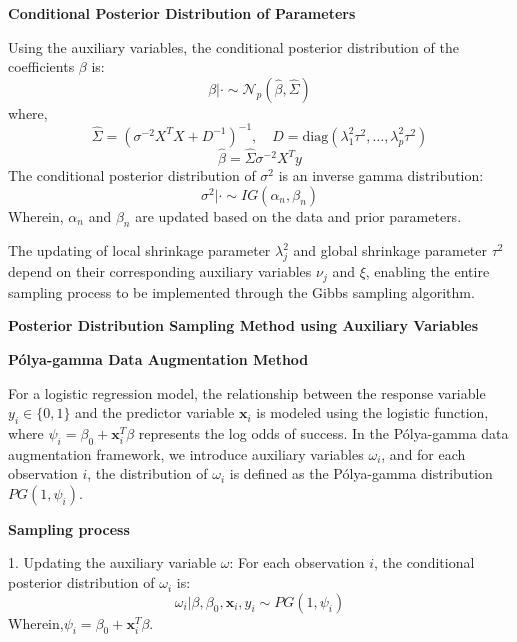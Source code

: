 \documentclass{mcmthesis}
\begin{document}
\begin{appendices}
\noindent\textbf{Conditional Posterior Distribution of Parameters}

Using the auxiliary variables, the conditional posterior distribution of the coefficients $\beta$ is:
\begin{equation}
  \beta|\cdot \sim \mathcal{N}_p(\hat{\beta}, \hat{\Sigma}) \tag{8}
\end{equation}
where,
\begin{equation}
  \hat{\Sigma} = (\sigma^{-2}X^TX + D^{-1})^{-1}, \quad D = \text{diag}(\lambda_1^2\tau^2, \ldots, \lambda_p^2\tau^2) \tag{9}
\end{equation}
\begin{equation}
  \hat{\beta} = \hat{\Sigma}\sigma^{-2}X^Ty \tag{10}
\end{equation}
The conditional posterior distribution of $\sigma^2$ is an inverse gamma distribution: 
\begin{equation}
  \sigma^2|\cdot \sim IG\left(\alpha_n, \beta_n\right) \tag{11}
\end{equation}
Wherein, $\alpha_n$ and $\beta_n$ are updated based on the data and prior parameters.

The updating of local shrinkage parameter $\lambda_j^2$ and global shrinkage parameter $\tau^2$ depend on their corresponding auxiliary variables $\nu_j$ and $\xi$, enabling the entire sampling process to be implemented through the Gibbs sampling algorithm.

\centerline{\textbf{Posterior Distribution Sampling Method using Auxiliary Variables}}

\noindent\textbf{Pólya-gamma Data Augmentation Method}

For a logistic regression model, the relationship between the response variable $y_i \in \{0, 1\}$ and the predictor variable $\mathbf{x}_i$ is modeled using the logistic function, where $\psi_i = \beta_0 + \mathbf{x}_i^T \beta$ represents the log odds of success. In the Pólya-gamma data augmentation framework, we introduce auxiliary variables $\omega_i$, and for each observation $i$, the distribution of $\omega_i$ is defined as the Pólya-gamma distribution $PG(1, \psi_i)$.

\noindent\textbf{Sampling process}

1. Updating the auxiliary variable $\omega$: For each observation $i$, the conditional posterior distribution of $\omega_i$ is:
$$
  \omega_i | \beta, \beta_0, \mathbf{x}_i, y_i \sim PG(1, \psi_i)
$$
Wherein,$\psi_i = \beta_0 + \mathbf{x}_i^T \beta$.


\end{appendices}
\end{document}
